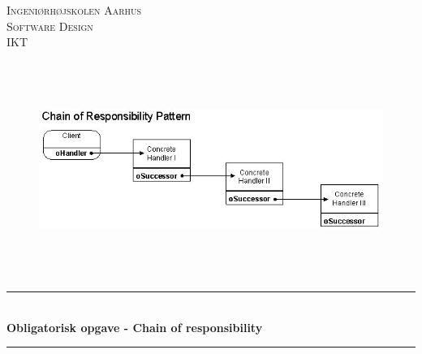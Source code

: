 \begin{titlepage}
		
		\newcommand{\HRule}{\rule{\linewidth}{0.5mm}} %
		
		\center %
		
		
		\textsc{\LARGE Ingeniørhøjskolen Aarhus}\\[1cm] %
		\textsc{\Large Software Design}\\[0.5cm] %
		\textsc{\large IKT}\\[0.5cm] %
		
		\begin{figure}[ht!]
			\centering
			\includegraphics[height=70mm, width=120mm]{figures/forside.jpg}
		\end{figure}

		
		
		\HRule \\[0.5cm]
		{ \huge \bfseries Obligatorisk opgave - Chain of responsibility }\\[0.4cm] %
		\HRule \\[0.5cm]
		
		

\end{titlepage}
